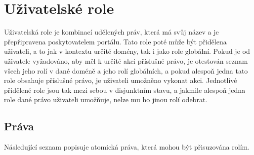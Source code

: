 \section{Uživatelské role}
Uživatelská role je kombinací udělených práv, která má svůj název a je přepřipravena poskytovatelem portálu. Tato role poté může být přidělena uživateli, a to jak v kontextu určité domény, tak i jako role globální. Pokud je od uživatele vyžadováno, aby měl k určité akci příslušné právo, je otestován seznam všech jeho rolí v dané doméně a jeho rolí globálních, a pokud alespoň jedna tato role obsahuje příslušné právo, je uživateli umožněno vykonat akci. Jednotlivé přidělené role jsou tak mezi sebou v disjunktním stavu, a jakmile alespoň jedna role dané právo uživateli umožňuje, nelze mu ho jinou rolí odebrat.

\subsection{Práva}
Následující seznam popisuje atomická práva, která mohou být přisuzována rolím.

